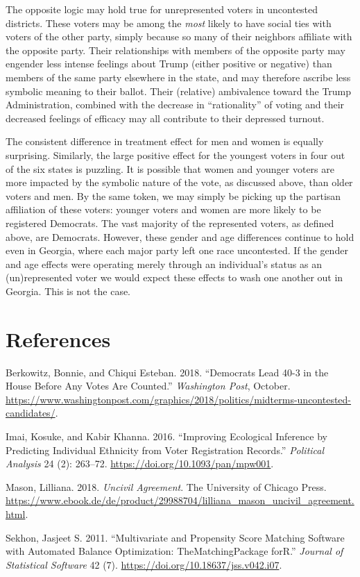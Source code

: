\documentclass[
  12pt,
]{article}
\newlength{\cslhangindent}
\newenvironment{cslreferences}%
  {\setlength{\parindent}{0pt}%
  \everypar{\setlength{\hangindent}{\cslhangindent}}\ignorespaces}%
  {\par}
\begin{document}
The opposite logic may hold true for unrepresented voters in uncontested districts. These voters may be among the \emph{most} likely to have social ties with voters of the other party, simply because so many of their neighbors affiliate with the opposite party. Their relationships with members of the opposite party may engender less intense feelings about Trump (either positive or negative) than members of the same party elsewhere in the state, and may therefore ascribe less symbolic meaning to their ballot. Their (relative) ambivalence toward the Trump Administration, combined with the decrease in ``rationality'' of voting and their decreased feelings of efficacy may all contribute to their depressed turnout.

The consistent difference in treatment effect for men and women is equally surprising. Similarly, the large positive effect for the youngest voters in four out of the six states is puzzling. It is possible that women and younger voters are more impacted by the symbolic nature of the vote, as discussed above, than older voters and men. By the same token, we may simply be picking up the partisan affiliation of these voters: younger voters and women are more likely to be registered Democrats. The vast majority of the represented voters, as defined above, are Democrats. However, these gender and age differences continue to hold even in Georgia, where each major party left one race uncontested. If the gender and age effects were operating merely through an individual's status as an (un)represented voter we would expect these effects to wash one another out in Georgia. This is not the case.

\newpage

\hypertarget{references}{%
\section*{References}\label{references}}

\hypertarget{refs}{}
\begin{cslreferences}
\leavevmode\hypertarget{ref-wapo}{}%
Berkowitz, Bonnie, and Chiqui Esteban. 2018. ``Democrats Lead 40-3 in the House Before Any Votes Are Counted.'' \emph{Washington Post}, October. \url{https://www.washingtonpost.com/graphics/2018/politics/midterms-uncontested-candidates/}.

\leavevmode\hypertarget{ref-Imai2016}{}%
Imai, Kosuke, and Kabir Khanna. 2016. ``Improving Ecological Inference by Predicting Individual Ethnicity from Voter Registration Records.'' \emph{Political Analysis} 24 (2): 263--72. \url{https://doi.org/10.1093/pan/mpw001}.

\leavevmode\hypertarget{ref-Mason2018}{}%
Mason, Lilliana. 2018. \emph{Uncivil Agreement}. The University of Chicago Press. \url{https://www.ebook.de/de/product/29988704/lilliana_mason_uncivil_agreement.html}.

\leavevmode\hypertarget{ref-Sekhon2011}{}%
Sekhon, Jasjeet S. 2011. ``Multivariate and Propensity Score Matching Software with Automated Balance Optimization: TheMatchingPackage forR.'' \emph{Journal of Statistical Software} 42 (7). \url{https://doi.org/10.18637/jss.v042.i07}.
\end{cslreferences}
\end{document}
